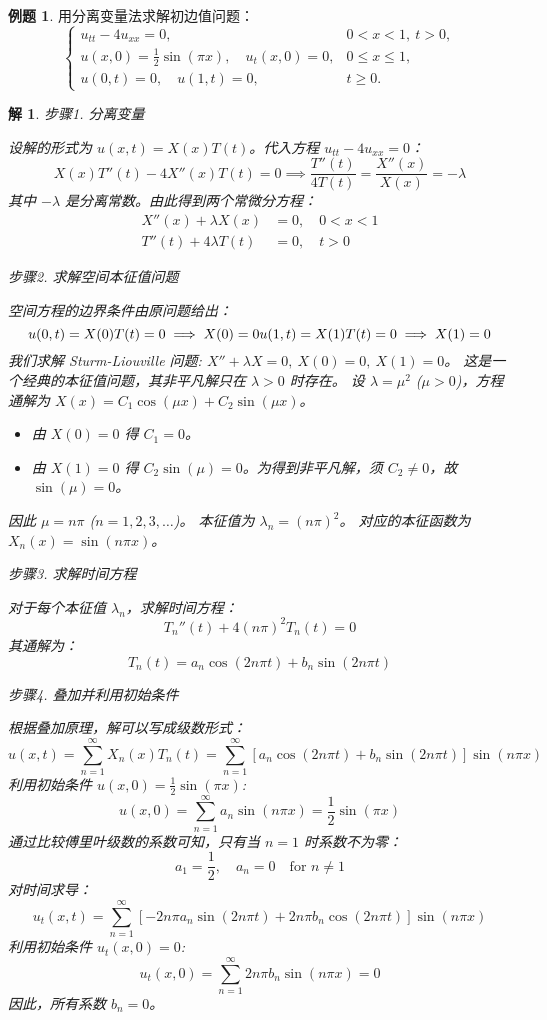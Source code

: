 \documentclass[12pt,a4paper]{article}
\numberwithin{subsection}{section}   %
\numberwithin{subsubsection}{subsection}
\theoremstyle{plain}
\newtheorem{solution}{解}[subsection]  %
\theoremstyle{definition}
\newtheorem{example}{例题}[subsection]  %
\theoremstyle{remark}
\theoremstyle{remark}
\begin{document}
	
	\begin{example}
		用分离变量法求解初边值问题：
		\[
		\begin{cases}
			u_{tt} - 4u_{xx} = 0, & 0 < x < 1, \ t > 0, \\
			u(x, 0) = \frac{1}{2}\sin(\pi x), \quad u_t(x, 0) = 0, & 0 \leq x \leq 1, \\
			u(0, t) = 0, \quad u(1, t) = 0, & t \geq 0.
		\end{cases}
		\]
	\end{example}
	\begin{solution}
	步骤1. 分离变量
		
		\noindent
		设解的形式为 $u(x,t) = X(x)T(t)$。代入方程 $u_{tt} - 4u_{xx} = 0$：
		\[
		X(x)T''(t) - 4X''(x)T(t) = 0 \implies \frac{T''(t)}{4T(t)} = \frac{X''(x)}{X(x)} = -\lambda
		\]
		其中 $-\lambda$ 是分离常数。由此得到两个常微分方程：
		\begin{align*}
			X''(x) + \lambda X(x) &= 0, \quad 0 < x < 1 \\
			T''(t) + 4\lambda T(t) &= 0, \quad t > 0
		\end{align*}
		
		
	步骤2. 求解空间本征值问题
		
		\noindent
		空间方程的边界条件由原问题给出：
		\[
		u(0,t) = X(0)T(t) = 0 \implies X(0)=0 \\
		u(1,t) = X(1)T(t) = 0 \implies X(1)=0
		\]
		我们求解 Sturm-Liouville 问题: $X'' + \lambda X = 0, \ X(0)=0, \ X(1)=0$。
		这是一个经典的本征值问题，其非平凡解只在 $\lambda > 0$ 时存在。
		设 $\lambda = \mu^2$ ($\mu>0$)，方程通解为 $X(x) = C_1 \cos(\mu x) + C_2 \sin(\mu x)$。
		\begin{itemize}
			\item 由 $X(0)=0$ 得 $C_1 = 0$。
			\item 由 $X(1)=0$ 得 $C_2 \sin(\mu) = 0$。为得到非平凡解，须 $C_2 \neq 0$，故 $\sin(\mu)=0$。
		\end{itemize}
		因此 $\mu = n\pi$ ($n=1, 2, 3, \dots$)。
		本征值为 $\lambda_n = (n\pi)^2$。
		对应的本征函数为 $X_n(x) = \sin(n\pi x)$。
		

		
		步骤3. 求解时间方程
		
		\noindent
		对于每个本征值 $\lambda_n$，求解时间方程：
		\[
		T_n''(t) + 4(n\pi)^2 T_n(t) = 0
		\]
		其通解为：
		\[
		T_n(t) = a_n \cos(2n\pi t) + b_n \sin(2n\pi t)
		\]
		
	步骤4. 叠加并利用初始条件
		
		\noindent
		根据叠加原理，解可以写成级数形式：
		\[
		u(x,t) = \sum_{n=1}^\infty X_n(x)T_n(t) = \sum_{n=1}^\infty [a_n \cos(2n\pi t) + b_n \sin(2n\pi t)] \sin(n\pi x)
		\]
		利用初始条件 $u(x,0) = \frac{1}{2}\sin(\pi x)$:
		\[
		u(x,0) = \sum_{n=1}^\infty a_n \sin(n\pi x) = \frac{1}{2}\sin(\pi x)
		\]
		通过比较傅里叶级数的系数可知，只有当 $n=1$ 时系数不为零：
		\[
		a_1 = \frac{1}{2}, \quad a_n = 0 \quad \text{for } n \neq 1
		\]
		对时间求导：
		\[
		u_t(x,t) = \sum_{n=1}^\infty [-2n\pi a_n \sin(2n\pi t) + 2n\pi b_n \cos(2n\pi t)] \sin(n\pi x)
		\]
		利用初始条件 $u_t(x,0) = 0$:
		\[
		u_t(x,0) = \sum_{n=1}^\infty 2n\pi b_n \sin(n\pi x) = 0
		\]
		因此，所有系数 $b_n=0$。
		

\end{solution}
\end{document}
